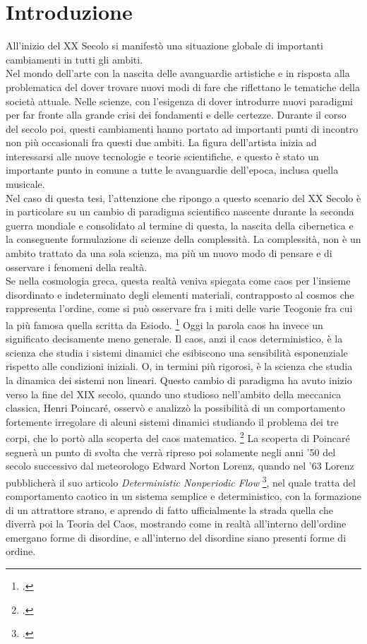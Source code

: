 \section{Introduzione}
\label{sec:Introduzione}

All'inizio del XX Secolo si manifestò una situazione globale
di importanti cambiamenti in tutti gli ambiti. \\
Nel mondo dell'arte con la nascita delle avanguardie artistiche e
in risposta alla problematica del dover trovare nuovi modi di fare
che riflettano le tematiche della società attuale.
Nelle scienze, con l'esigenza di dover introdurre nuovi paradigmi
per far fronte alla grande crisi dei fondamenti e delle certezze.
Durante il corso del secolo poi, questi cambiamenti hanno portato
ad importanti punti di incontro non più occasionali fra questi due ambiti.
La figura dell'artista inizia ad interessarsi alle nuove tecnologie
e teorie scientifiche, e questo è stato un importante punto in comune a tutte
le avanguardie dell'epoca, inclusa quella musicale. \\
Nel caso di questa tesi, l'attenzione che ripongo a questo scenario del XX Secolo
è in particolare su un cambio di paradigma scientifico
nascente durante la seconda guerra mondiale e consolidato al termine di questa,
la nascita della cibernetica e la conseguente formulazione
di scienze della complessità.
La complessità, non è un ambito trattato da una sola scienza,
ma più un nuovo modo di pensare e di osservare i fenomeni
della realtà. \\
Se nella cosmologia greca, questa realtà veniva spiegata come caos per 
l’insieme disordinato e indeterminato degli elementi materiali, contrapposto al cosmos che rappresenta l'ordine,
come si può osservare fra i miti delle varie Teogonie
fra cui la più famosa quella scritta da Esiodo. \footcite{esiodoteogonia}
Oggi la parola caos ha invece un significato decisamente meno generale. 
Il caos, anzi il caos deterministico, è la scienza che studia i 
sistemi dinamici che esibiscono una sensibilità esponenziale rispetto alle condizioni iniziali.
O, in termini più rigorosi, è la scienza che studia la dinamica dei sistemi non lineari.
Questo cambio di paradigma ha avuto inizio verso la fine del XIX secolo,
quando uno studioso nell'ambito della meccanica classica, Henri Poincaré,
osservò e analizzò la possibilità di un comportamento fortemente irregolare
di alcuni sistemi dinamici studiando il problema dei tre corpi,
che lo portò alla scoperta del caos matematico. \footcite{poincaréproblema}
La scoperta di Poincaré segnerà un punto di svolta che verrà
ripreso poi solamente negli anni '50 del secolo successivo dal meteorologo
Edward Norton Lorenz,
quando nel '63 Lorenz pubblicherà il suo articolo 
\textit{Deterministic Nonperiodic Flow} \footcite{Lorenzdnf},
nel quale tratta del comportamento caotico in un sistema semplice
e deterministico, con la formazione di un attrattore strano,
e aprendo di fatto ufficialmente la strada quella che diverrà poi
la Teoria del Caos,
mostrando come in realtà all'interno dell'ordine emergano forme di disordine,
e all'interno del disordine siano presenti forme di ordine.


